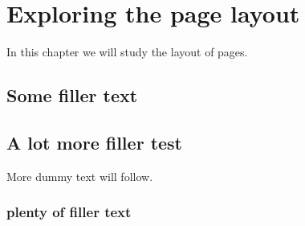 \documentclass[a4paper,14pt]{book}
\begin{document}
\chapter{Exploring the page layout}
In this chapter we will study the layout of pages.
\section{Some filler text}
\blindtext
\section{A lot more filler test}
More dummy text will follow.
\subsection{plenty of filler text}
\blindtext[10]
\end{document}
